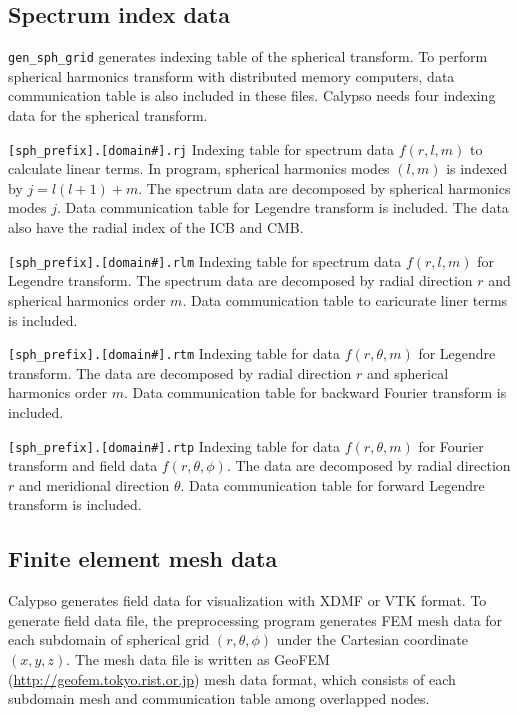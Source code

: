 \subsection{Spectrum index data}
\verb|gen_sph_grid| generates indexing table of the spherical transform. To perform spherical harmonics transform with distributed memory computers, data communication table is also included in these files. Calypso needs four indexing data for the spherical transform.
%
\begin{description}
\item{\verb|[sph_prefix].[domain#].rj|} Indexing table for spectrum data $f(r,l,m)$ to calculate linear terms. In program,  spherical harmonics modes $(l,m)$ is indexed by $j = l(l+1) + m$. The spectrum data are decomposed by spherical harmonics modes $j$. Data communication table for Legendre transform is included. The data also have the radial index of the ICB and CMB.
\item{\verb|[sph_prefix].[domain#].rlm|} Indexing table for spectrum data $f(r,l,m)$ for Legendre transform. The spectrum data are decomposed by radial direction $r$ and spherical harmonics order $m$. Data communication table to caricurate liner terms is included.
\item{\verb|[sph_prefix].[domain#].rtm|} Indexing table for data $f(r,\theta,m)$ for Legendre transform. The data are decomposed by radial direction $r$ and spherical harmonics order $m$. Data communication table for backward Fourier transform is included.
\item{\verb|[sph_prefix].[domain#].rtp|} Indexing table for data $f(r,\theta,m)$ for Fourier transform and field data $f(r,\theta,\phi)$. The data are decomposed by radial direction $r$ and meridional direction $\theta$. Data communication table for forward Legendre transform is included.
\end{description}
%

\subsection{Finite element mesh data}
Calypso generates field data for visualization with XDMF or VTK format. To generate field data file, the preprocessing program generates FEM mesh data for each subdomain of spherical grid $(r,\theta,\phi)$ under the Cartesian coordinate $(x,y,z)$. The mesh data file is written as GeoFEM (\url{http://geofem.tokyo.rist.or.jp}) mesh data format, which consists of each subdomain mesh and communication table among overlapped nodes. 

